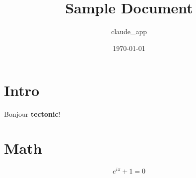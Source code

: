 \documentclass[11pt]{article}
\title{Sample Document}
\author{claude\_app}
\date{\today}
\begin{document}
\maketitle

\section{Intro}
Bonjour \textbf{tectonic}!

\section{Math}
\[
	e^{i\pi} + 1 = 0
\]
\end{document}
